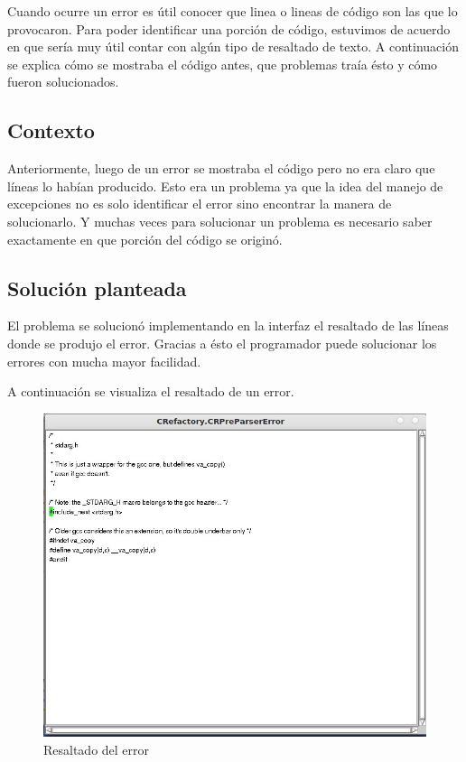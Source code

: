 \documentclass[a4paper,oneside,10pt]{article}
\begin{document}
Cuando ocurre un error es útil conocer que linea o lineas de código son las que lo provocaron. Para poder identificar una porción de código, estuvimos de acuerdo en que sería muy útil contar con algún tipo de resaltado de texto. A continuación se explica cómo se mostraba el código antes, que problemas traía ésto y cómo fueron solucionados.

\subsection{Contexto}
Anteriormente, luego de un error se mostraba el c\'odigo pero no era claro que l\'ineas lo hab\'ian producido. Esto era un problema ya que la idea del manejo de excepciones no es solo identificar el error sino encontrar la manera de solucionarlo. Y muchas veces para solucionar un problema es necesario saber exactamente en que porci\'on del c\'odigo se origin\'o.

\subsection{Soluci\'on planteada}
El problema se solucion\'o implementando en la interfaz el resaltado de las l\'ineas donde se produjo el error. Gracias a \'esto el programador puede solucionar los errores con mucha mayor facilidad.

A continuaci\'on se visualiza el resaltado de un error.
\begin{figure}[h!]
  \centering
    \includegraphics[scale=0.50]{images/codigo_modificado/highlight_preparser.jpg}
     \caption{Resaltado del error}
\end{figure}
\end{document}
